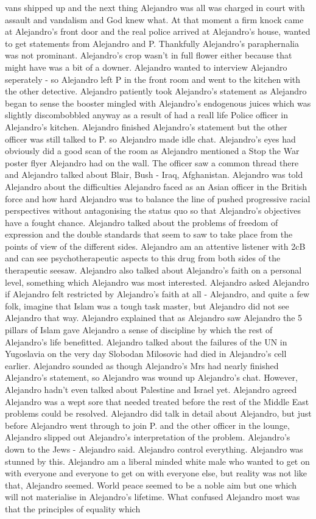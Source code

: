 \documentclass[12pt]{book}
\begin{document}
vans shipped up and the next thing Alejandro was all was charged in court with assault and vandalism and God knew what. At that moment a firm knock came at Alejandro's front door and the real police arrived at Alejandro's house, wanted to get statements from Alejandro and P. Thankfully Alejandro's paraphernalia was not prominant. Alejandro's crop wasn't in full flower either because that might have was a bit of a downer. Alejandro wanted to interview Alejandro seperately - so Alejandro left P in the front room and went to the kitchen with the other detective. Alejandro patiently took Alejandro's statement as Alejandro began to sense the booster mingled with Alejandro's endogenous juices which was slightly discombobbled anyway as a result of had a reall life Police officer in Alejandro's kitchen. Alejandro finished Alejandro's statement but the other officer was still talked to P. so Alejandro made idle chat. Alejandro's eyes had obviously did a good scan of the room as Alejandro mentioned a Stop the War poster flyer Alejandro had on the wall. The officer saw a common thread there and Alejandro talked about Blair, Bush - Iraq, Afghanistan. Alejandro was told Alejandro about the difficulties Alejandro faced as an Asian officer in the British force and how hard Alejandro was to balance the line of pushed progressive racial perspectives without antagonising the status quo so that Alejandro's objectives have a fought chance. Alejandro talked about the problems of freedom of expression and the double standards that seem to saw to take place from the points of view of the different sides. Alejandro am an attentive listener with 2cB and can see psychotherapeutic aspects to this drug from both sides of the therapeutic seesaw. Alejandro also talked about Alejandro's faith on a personal level, something which Alejandro was most interested. Alejandro asked Alejandro if Alejandro felt restricted by Alejandro's faith at all - Alejandro, and quite a few folk, imagine that Islam was a tough task master, but Alejandro did not see Alejandro that way. Alejandro explained that as Alejandro saw Alejandro the 5 pillars of Islam gave Alejandro a sense of discipline by which the rest of Alejandro's life benefitted. Alejandro talked about the failures of the UN in Yugoslavia on the very day Slobodan Milosovic had died in Alejandro's cell earlier. Alejandro sounded as though Alejandro's Mrs had nearly finished Alejandro's statement, so Alejandro was wound up Alejandro's chat. However, Alejandro hadn't even talked about Palestine and Israel yet. Alejandro agreed Alejandro was a wept sore that needed treated before the rest of the Middle East problems could be resolved. Alejandro did talk in detail about Alejandro, but just before Alejandro went through to join P. and the other officer in the lounge, Alejandro slipped out Alejandro's interpretation of the problem. Alejandro's down to the Jews - Alejandro said. Alejandro control everything. Alejandro was stunned by this. Alejandro am a liberal minded white male who wanted to get on with everyone and everyone to get on with everyone else, but reality was not like that, Alejandro seemed. World peace seemed to be a noble aim but one which will not materialise in Alejandro's lifetime. What confused Alejandro most was that the principles of equality which 
\end{document}
